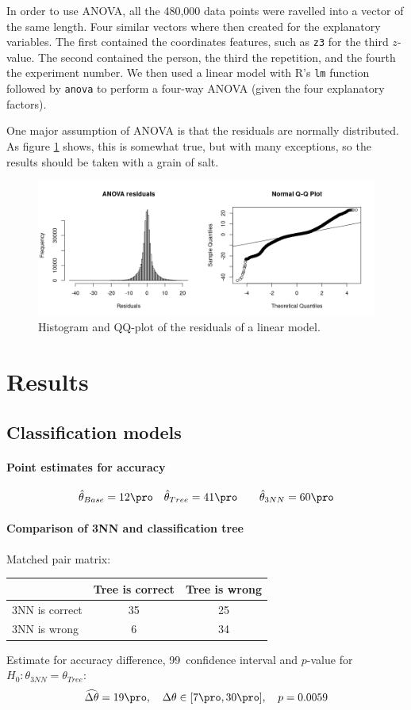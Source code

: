 \documentclass[11pt,fleqn]{article}
\begin{document}
In order to use ANOVA, all the 480,000 data points were ravelled into a vector of the same length.
Four similar vectors where then created for the explanatory variables.
The first contained the coordinates features, such as \texttt{z3} for the third $ z $-value.
The second contained the person, the third the repetition, and the fourth the experiment number.
We then used a linear model with R's \texttt{lm} function followed by \texttt{anova} to perform a four-way ANOVA (given the four explanatory factors).

One major assumption of ANOVA is that the residuals are normally distributed.
As figure \ref{fig:qq} shows, this is somewhat true, but with many exceptions, so the results should be taken with a grain of salt.
\begin{figure}[H]
	\centering
	\includegraphics[width=.5\textwidth]{qq}
	\caption{Histogram and QQ-plot of the residuals of a linear model.}\label{fig:qq}
\end{figure}

\section{Results}

\subsection{Classification models}

\paragraph{Point estimates for accuracy}

\begin{align*}
	& \hat \theta_{Base}= 12\pro 
	&& \hat \theta_{Tree} =41\pro 
	&&&\hat \theta_{3NN} = 60 \pro 
\end{align*}
\paragraph{Comparison of 3NN and classification tree}
Matched pair matrix:

\begin{table}[H]
	\centering
	\begin{tabular}{l|c c}
		&Tree is correct& Tree is wrong \\
		\hline
		3NN is correct &35& 25\\
		3NN is wrong& 6& 34
	\end{tabular}
\end{table}\noindent 
Estimate for accuracy difference, 99\pro\ confidence interval and \(p\)-value for \(H_0: \theta_{3NN}=\theta_{Tree}\):
\[
\widehat{\Delta \theta} = 19\pro,\quad  \Delta \theta\in[7\pro , 30\pro], \quad p = 0.0059 
\]
\end{document}
